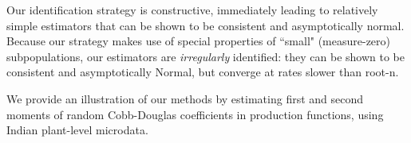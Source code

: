 Our identification strategy is constructive, immediately leading to relatively simple estimators that can be shown to be consistent and asymptotically normal. Because our strategy makes use of special properties of ``small" (measure-zero) subpopulations, our estimators are \emph{irregularly} identified: they can be shown to be consistent and asymptotically Normal, but converge at rates slower than root-n.

We provide an illustration of our methods by estimating first and second moments of random Cobb-Douglas coefficients in production functions, using Indian plant-level microdata. 

